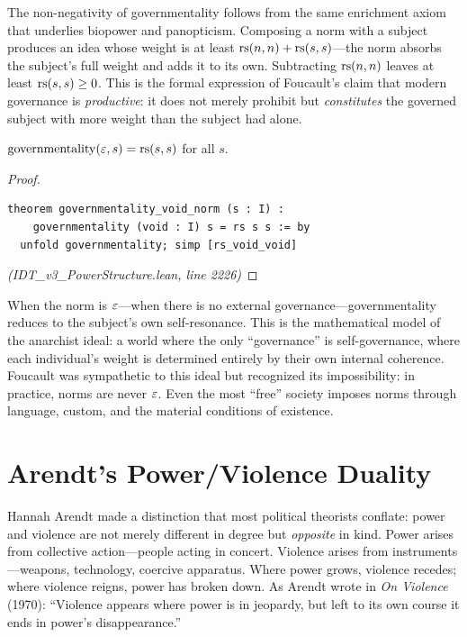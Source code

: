 \begin{remark}
The non-negativity of governmentality follows from the same enrichment axiom
that underlies biopower and panopticism. Composing a norm with a subject
produces an idea whose weight is at least $\mathrm{rs}(n,n) + \mathrm{rs}(s,s)$---the norm
absorbs the subject's full weight and adds it to its own. Subtracting $\mathrm{rs}(n,n)$
leaves at least $\mathrm{rs}(s,s) \geq 0$. This is the formal expression of Foucault's
claim that modern governance is \emph{productive}: it does not merely prohibit
but \emph{constitutes} the governed subject with more weight than the subject
had alone.
\end{remark}

\begin{theorem}
\label{thm:governmentality-void}
$\mathrm{governmentality}(\varepsilon, s) = \mathrm{rs}(s, s)$ for all $s$.
\end{theorem}

\begin{proof}
\begin{lstlisting}
theorem governmentality_void_norm (s : I) :
    governmentality (void : I) s = rs s s := by
  unfold governmentality; simp [rs_void_void]
\end{lstlisting}
\textit{(IDT\_v3\_PowerStructure.lean, line 2226)}
\end{proof}

\begin{interpretation}
When the norm is $\varepsilon$---when there is no external governance---governmentality
reduces to the subject's own self-resonance. This is the mathematical model
of the anarchist ideal: a world where the only ``governance'' is
self-governance, where each individual's weight is determined entirely by their
own internal coherence. Foucault was sympathetic to this ideal but recognized
its impossibility: in practice, norms are never $\varepsilon$. Even the most
``free'' society imposes norms through language, custom, and the material
conditions of existence.
\end{interpretation}

\section{Arendt's Power/Violence Duality}

Hannah Arendt made a distinction that most political theorists conflate: power
and violence are not merely different in degree but \emph{opposite} in kind.
Power arises from collective action---people acting in concert. Violence arises
from instruments---weapons, technology, coercive apparatus. Where power grows,
violence recedes; where violence reigns, power has broken down. As Arendt wrote
in \emph{On Violence} (1970): ``Violence appears where power is in jeopardy,
but left to its own course it ends in power's disappearance.''

